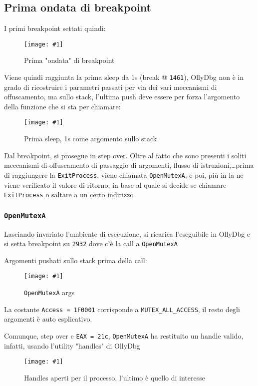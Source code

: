 \documentclass[
    a4paper, %
    11pt %
]{article}
\newcommand{\pic}[4]{\begin{figure}[H]
            \centering
            \texttt{[image: \#1]}
            \caption{#2}
            \label{fig:#1}
            \end{figure}}
\begin{document}
            \subsection{Prima ondata di breakpoint}
            
            I primi breakpoint settati quindi:

            \pic{brkp_first_wave}{Prima "ondata" di breakpoint}{18cm}{3cm}

            Viene quindi raggiunta la prima sleep da 1s (break @ \texttt{1461}), OllyDbg non è in grado di ricostruire
            i parametri passati per via dei vari meccanismi di offuscamento, ma sullo stack,
            l'ultima push deve essere per forza l'argomento della funzione che si sta per
            chiamare:

            \pic{first_sleep_1s}{Prima sleep, 1s come argomento sullo stack}{8cm}{1cm}

            Dal breakpoint, si prosegue in step over. Oltre al fatto che sono presenti i soliti meccanismi
            di offuscamento di passaggio di argomenti, flusso di istruzioni,\dots  prima di raggiungere la
            \texttt{ExitProcess}, viene chiamata \texttt{OpenMutexA}, e poi, più in la ne viene 
            verificato il valore di ritorno, in base al quale si decide se chiamare \texttt{ExitProcess} o 
            saltare a un certo indirizzo

            \subsubsection{\texttt{OpenMutexA}}

            Lasciando invariato l'ambiente di esecuzione, si ricarica l'eseguibile in OllyDbg e si
            setta breakpoint su \texttt{2932} dove c'è la call a \texttt{OpenMutexA}

            Argomenti pushati sullo stack prima della call:
            \pic{oma_args}{\texttt{OpenMutexA} args}{8cm}{1cm}

            La costante \texttt{Access = 1F0001} corrisponde a 
            \texttt{MUTEX\_ALL\_ACCESS}, il resto degli argomenti è auto esplicativo.

            Comunque, step over e \texttt{EAX = 21c}, \texttt{OpenMutexA} ha restituito un handle valido,
            infatti, usando l'utility "handles" di OllyDbg

            \pic{handles_mutant}{Handles aperti per il processo, l'ultimo è quello di interesse}{15cm}{4cm}
\end{document}
